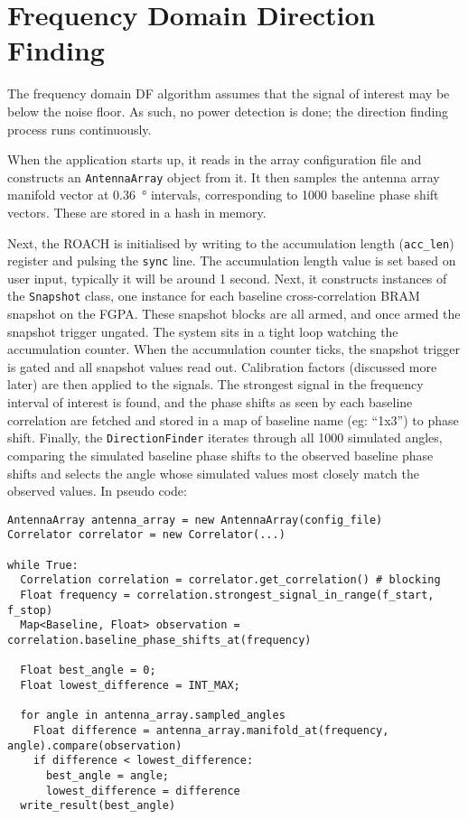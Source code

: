 \section{Frequency Domain Direction Finding}
The frequency domain DF algorithm assumes that the signal of interest may be below the noise floor. As such, no power detection is done; the direction finding process runs continuously.

When the application starts up, it reads in the array configuration file and constructs an \lstinline{AntennaArray} object from it. It then samples the antenna array manifold vector at \SI{0.36}{\degree} intervals, corresponding to 1000 baseline phase shift vectors. These are stored in a hash in memory. 

Next, the ROACH is initialised by writing to the accumulation length (\lstinline{acc_len}) register and pulsing the \lstinline{sync} line. The accumulation length value is set based on user input, typically it will be around 1 second. Next, it constructs instances of the \lstinline{Snapshot} class, one instance for each baseline cross-correlation BRAM snapshot on the FGPA. These snapshot blocks are all armed, and once armed the snapshot trigger ungated. The system sits in a tight loop watching the accumulation counter. When the accumulation counter ticks, the snapshot trigger is gated and all snapshot values read out. Calibration factors (discussed more later) are then applied to the signals. The strongest signal in the frequency interval of interest is found, and the phase shifts as seen by each baseline correlation are fetched and stored in a map of baseline name (eg: ``1x3'')  to phase shift. Finally, the \lstinline{DirectionFinder} iterates through all 1000 simulated angles, comparing the simulated baseline phase shifts to the observed baseline phase shifts and selects the angle whose simulated values most closely match the observed values. In pseudo code:

\begin{lstlisting}
AntennaArray antenna_array = new AntennaArray(config_file)
Correlator correlator = new Correlator(...)

while True:
  Correlation correlation = correlator.get_correlation() # blocking
  Float frequency = correlation.strongest_signal_in_range(f_start, f_stop)
  Map<Baseline, Float> observation = correlation.baseline_phase_shifts_at(frequency)

  Float best_angle = 0;
  Float lowest_difference = INT_MAX;

  for angle in antenna_array.sampled_angles
    Float difference = antenna_array.manifold_at(frequency, angle).compare(observation)
    if difference < lowest_difference:
      best_angle = angle;
      lowest_difference = difference
  write_result(best_angle)
\end{lstlisting}

